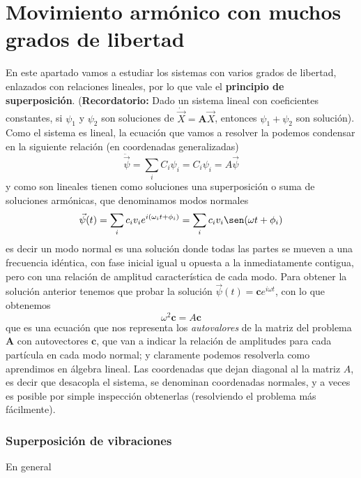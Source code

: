 \documentclass[a4paper,spanish]{article}
\numberwithin{equation}{section}
\begin{document}
\part{Movimiento arm\'onico con muchos grados de libertad}

En este apartado vamos a estudiar los sistemas con varios grados de libertad, enlazados con relaciones lineales, por lo que vale el \textbf{principio de superposici\'on}. (\textbf{Recordatorio:} Dado un sistema lineal con coeficientes constantes, si $\psi_1$ y $\psi_2$ son soluciones de $\dot{\overrightarrow{X}}=\textbf{A}\overrightarrow{X}$, entonces $\psi_1 + \psi_2$ son soluci\'on). Como el sistema es lineal, la ecuaci\'on que vamos a resolver la podemos condensar en la siguiente relaci\'on (en coordenadas generalizadas)
    \begin{equation}
        \ddot{\vec{\psi}} = \sum_i C_i \psi_i = C_i \psi_i = A \vec{\psi}
        \label{eq:oscilador}
    \end{equation}
	y como son lineales tienen como soluciones una superposici\'on o suma de soluciones arm\'onicas, que denominamos modos normales
	\begin{equation}
		\vec{\psi}(t) = \sum_i c_i v_i e^{i (\omega_i t + \phi_i)} =  \sum_i c_i v_i \sen(\omega t + \phi_i)
		\label{eq:oscilador_solucion}
	\end{equation}
	es decir un modo normal es una soluci\'on donde todas las partes se mueven a una frecuencia id\'entica, con fase inicial igual u opuesta a la inmediatamente contigua, pero con una relaci\'on de amplitud caracter\'istica de cada modo. Para obtener la soluci\'on anterior tenemos que probar la soluci\'on $\vec{\psi}(t) = \textbf{c} e^{i \omega t}$, con lo que obtenemos
	\begin{equation}
		\omega^2 \textbf{c} = A \textbf{c}
		\label{eq:oscilador_autovalores}
	\end{equation}
	que es una ecuaci\'on que nos representa los \textit{autovalores} de la matriz del problema $\textbf{A}$ con autovectores $\textbf{c}$, que van a indicar la relaci\'on de amplitudes para cada part\'icula en cada modo normal; y claramente podemos resolverla como aprendimos en \'algebra lineal. Las coordenadas que dejan diagonal al la matriz $A$, es decir que desacopla el sistema, se denominan coordenadas normales, y a veces es posible por simple inspecci\'on obtenerlas (resolviendo el problema m\'as f\'acilmente).

\section{Superposici\'on de vibraciones}
En general
\end{document}
